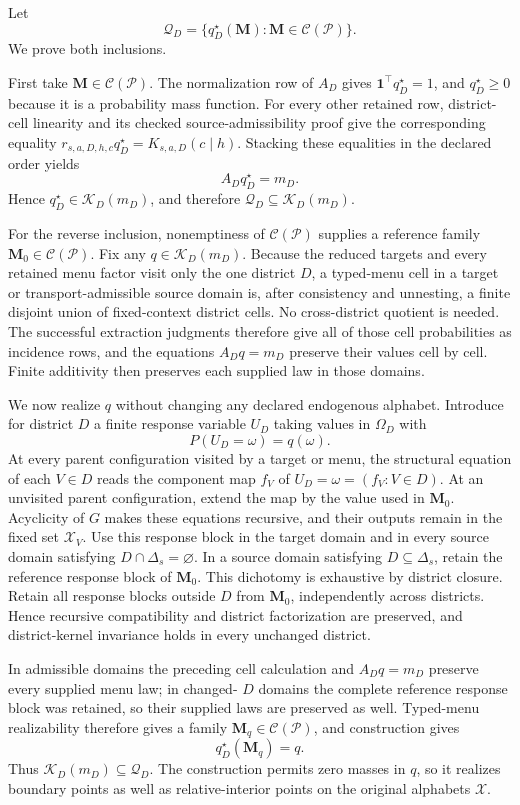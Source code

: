 Let
\[
 \mathcal Q_D=\{q_D^\star(\mathbf M):\mathbf M\in\mathcal C(\mathcal P)\}.
\]
We prove both inclusions.

First take \(\mathbf M\in\mathcal C(\mathcal P)\).  The normalization row of \(A_D\) gives \(\mathbf 1^\top q_D^\star=1\), and \(q_D^\star\geq0\) because it is a probability mass function.  For every other retained row, district-cell linearity and its checked source-admissibility proof give the corresponding equality
\(
 r_{s,a,D,h,c}q_D^\star=K_{s,a,D}(c\mid h).
\)
Stacking these equalities in the declared order yields
\[
 A_Dq_D^\star=m_D.
\]
Hence \(q_D^\star\in\mathcal K_D(m_D)\), and therefore
\(
 \mathcal Q_D\subseteq\mathcal K_D(m_D).
\)

For the reverse inclusion, nonemptiness of \(\mathcal C(\mathcal P)\) supplies a reference family \(\mathbf M_0\in\mathcal C(\mathcal P)\).  Fix any \(q\in\mathcal K_D(m_D)\).  Because the reduced targets and every retained menu factor visit only the one district \(D\), a typed-menu cell in a target or transport-admissible source domain is, after consistency and unnesting, a finite disjoint union of fixed-context district cells.  No cross-district quotient is needed.  The successful extraction judgments therefore give all of those cell probabilities as incidence rows, and the equations \(A_Dq=m_D\) preserve their values cell by cell.  Finite additivity then preserves each supplied law in those domains.

We now realize \(q\) without changing any declared endogenous alphabet.  Introduce for district \(D\) a finite response variable \(U_D\) taking values in \(\Omega_D\) with
\[
 P(U_D=\omega)=q(\omega).
\]
At every parent configuration visited by a target or menu, the structural equation of each \(V\in D\) reads the component map \(f_V\) of \(U_D=\omega=(f_V:V\in D)\).  At an unvisited parent configuration, extend the map by the value used in \(\mathbf M_0\).  Acyclicity of \(G\) makes these equations recursive, and their outputs remain in the fixed set \(\mathcal X_V\).  Use this response block in the target domain and in every source domain satisfying \(D\cap\Delta_s=\varnothing\).  In a source domain satisfying \(D\subseteq\Delta_s\), retain the reference response block of \(\mathbf M_0\).  This dichotomy is exhaustive by district closure.  Retain all response blocks outside \(D\) from \(\mathbf M_0\), independently across districts.  Hence recursive compatibility and district factorization are preserved, and district-kernel invariance holds in every unchanged district.

In admissible domains the preceding cell calculation and \(A_Dq=m_D\) preserve every supplied menu law; in changed-
\(D\) domains the complete reference response block was retained, so their supplied laws are preserved as well.  Typed-menu realizability therefore gives a family \(\mathbf M_q\in\mathcal C(\mathcal P)\), and construction gives
\[
 q_D^\star(\mathbf M_q)=q.
\]
Thus \(\mathcal K_D(m_D)\subseteq\mathcal Q_D\).  The construction permits zero masses in \(q\), so it realizes boundary points as well as relative-interior points on the original alphabets \(\mathcal X\).
